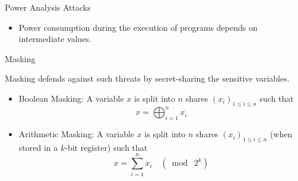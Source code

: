\begin{frame}{Power Analysis Attacks}

\begin{itemize}

	\item Power consumption during the execution of programs depends on intermediate values.


\end{itemize}
\vspace{-4pt}


\end{frame}



\begin{frame}{Masking}

Masking defends against such threats by secret-sharing the sensitive variables.
\pause
\begin{itemize}
	\item Boolean Masking: A variable $x$ is split into $n$ shares $(x_i)_{1 \leq i \leq n}$ such that
	\[
	x = \bigoplus_{i=1}^n x_i
	\]
	\pause
	\item Arithmetic Masking: A variable $x$ is split into $n$ shares $(x_i)_{1 \leq i \leq n}$ (when stored in a $k$-bit register) such that
	\[
	x = \sum_{i=1}^n x_i \quad (\bmod\; 2^k)
	\]
\end{itemize}

\end{frame}


